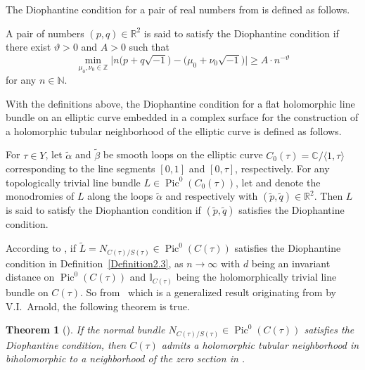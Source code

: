 \documentclass[pdftex]{sigma}
\numberwithin{equation}{section}
\newtheorem{Theorem}{Theorem}[section]
\begin{document}
The Diophantine condition for a pair of real numbers from \cite{Takayuki-Takato2} is defined as follows.

\begin{Definition} \label{Definition2.2}
A pair of numbers $(p,q)\in \mathbb{R}^2$ is said to satisfy the Diophantine condition if there exist $\vartheta >0$ and $A>0$ such that
\[
\underset{\mu_0 ,\nu_0 \in \mathbb{Z}}{\min } \big| n\bigl(p+q\sqrt{-1} \bigr)-\bigl(\mu_0 +\nu_0\sqrt{-1} \bigr)\big| \geq A\cdot n^{-\vartheta }
\]
for any $n \in \mathbb{N}$.
\end{Definition}

With the definitions above, the Diophantine condition for a flat holomorphic line bundle on an elliptic curve embedded in a complex surface for the construction of a holomorphic tubular neighborhood of the elliptic curve is defined as follows.

\begin{Definition} \label{Definition2.3}
For $\tau\in Y$, let $\widetilde{\alpha}$ and $\widetilde{\beta}$ be smooth loops on the elliptic curve $C_0(\tau)=\mathbb{C}/ \langle 1,\tau \rangle$ corresponding to the line segments $[0,1]$ and $[0,\tau]$, respectively. For any topologically trivial line bundle $L\in \operatorname{Pic}^0(C_0(\tau))$, let  and  denote the monodromies of $L$ along the loops $\widetilde{\alpha}$ and \smash{$\widetilde{\beta}$} respectively with $(\widetilde{p},\widetilde{q})\in \mathbb{R}^2$. Then $L$ is said to satisfy the Diophantion condition if $(\widetilde{p},\widetilde{q})$ satisfies the Diophantine condition.
\end{Definition}

According to \cite[Theorem~1.6]{Takayuki-Takato1}, if $\widetilde{L}=N_{C(\tau)/S(\tau)}\in \operatorname{Pic}^0(C(\tau))$ satisfies the Diophantine condition in Definition~\ref{Definition2.3},  as $n\rightarrow\infty$ with $d$ being an invariant distance on $\operatorname{Pic}^0(C(\tau))$ and $\mathbb{I}_{C(\tau)}$ being the holomorphically trivial line bundle on $C(\tau)$. So from~\cite[Theorem 3]{Tetsuo} which is a generalized result originating from \cite{Vladimir} by V.I.~Arnold, the following theorem is true.

\begin{Theorem}[\cite{Takayuki-Takato2}] \label{Theorem2.4}
If the normal bundle \emph{$N_{C(\tau)/S(\tau)}\in \operatorname{Pic}^0(C(\tau))$} satisfies the Diophantine condition, then $C(\tau)$ admits a holomorphic tubular neighborhood in  biholomorphic to a neighborhood of the zero section in .
\end{Theorem}
\end{document}
